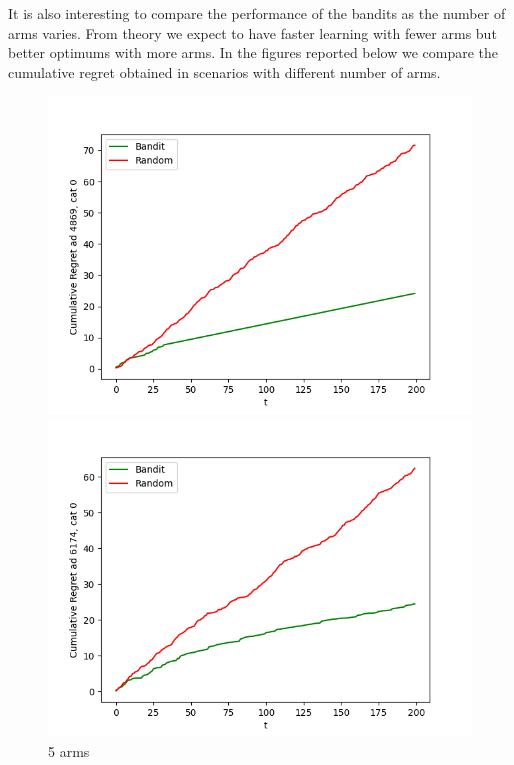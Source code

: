 \documentclass{article}
\begin{document}
It is also interesting to compare the performance of the bandits as the number of arms varies. From theory we expect to have faster learning with fewer arms but better optimums with more arms.
In the figures reported below we compare the cumulative regret obtained in scenarios with different number of arms.
\begin{figure}[H]
\begin{minipage}{0.33\textwidth}
\centering
\includegraphics[width=1\linewidth]{images/quality 5 arms 200 days.png}
\caption{5 arms}
\end{minipage}
\begin{minipage}{0.33\textwidth}
\centering
\includegraphics[width=1\linewidth]{images/quality 10 arms 200 days.png}

\end{minipage}
\end{figure}
\end{document}
